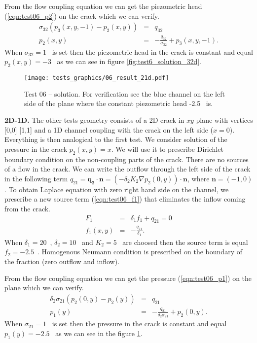 From the flow coupling equation we can get the piezometric head (\ref{eqn:test06_p2}) on the crack which we can verify.
\begin{eqnarray} 
     \sigma_{32}  ( p_3(x,y,-1) - p_2(x,y) ) &=& q_{32} \nonumber\\
     p_2(x,y) &=& -\frac{q_{32}}{\sigma_{32}} + p_3(x,y,-1) \label{eqn:test06_p2}.
\end{eqnarray}   
When $\sigma_{32} = 1$~ is set then the piezometric head in the crack is constant and equal $p_2(x,y) = -3$~
as we can see in figure \ref{fig:test6_solution_32d}.

%
\begin{figure}[h!]
\centering
\texttt{[image: tests\_graphics/06\_result\_21d.pdf]}
\caption{Test 06 -- solution. For verification see the blue channel on the left side of the plane 
         where the constant piezometric head -2.5~ is.}
\label{fig:test6_solution_21d}
\end{figure}
%
\textbf{2D-1D.}
The other tests geometry consists of a 2D crack in $xy$ plane with vertices [0,0] [1,1] and a 1D channel coupling with the crack on the left side ($x=0$). 
Everything is then analogical to the first test.
We consider solution of the pressure in the crack $p_2(x,y) = x$. We will use it to prescribe Dirichlet boundary condition on the non-coupling parts of the crack.
There are no sources of a flow in the crack. 
We can write the outflow through the left side of the crack in the following term $q_{21} = \mathbf{q_2} \cdot \mathbf{n} = (- \delta_2 K_2 \nabla p_2(0,y))\cdot \mathbf{n}$,
where $\mathbf{n}=(-1,0)$.
To obtain Laplace equation with zero right hand side on the channel, we prescribe a new source term (\ref{eqn:test06_f1}) that eliminates the inflow coming from the crack.         
\begin{eqnarray}
    F_1 &=& \delta_1  f_1 + q_{21} = 0   \nonumber\\
    f_1(x,y) &=& -\frac{q_{21}}{\delta_1}   \label{eqn:test06_f1}.
\end{eqnarray}
When $\delta_1 = 20$~, $\delta_2 = 10$~ and $K_2 = 5$~ are choosed then the source term is equal $f_2 = -2.5$~.
Homogenous Neumann condition is prescribed on the boundary of the fraction (zero outflow and inflow).

From the flow coupling equation we can get the pressure (\ref{eqn:test06_p1}) on the plane which we can verify.
\begin{eqnarray} 
     \delta_2 \sigma_{21} ( p_2(0,y) - p_2(y) ) &=& q_{21} \nonumber\\
     p_1(y) &=& -\frac{q_{21}}{\delta_2 \sigma_{21}} + p_2(0,y) \label{eqn:test06_p1}.
\end{eqnarray}   
When $\sigma_{21} = 1$~ is set then the pressure in the crack is constant and equal $p_1(y) = -2.5$~
as we can see in the figure \ref{fig:test6_solution_21d}.

